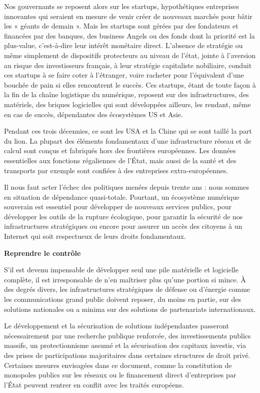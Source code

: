 \documentclass[a4paper]{article}
\begin{document}
Nos gouvernants se reposent alors sur les startups, hypothétiques entreprises innovantes qui seraient en mesure de venir créer de nouveaux marchés pour bâtir les « géants de demain ». Mais les startups sont gérées par des fondateurs et financées par des banques, des business Angels ou des fonds dont la priorité est la plus-value, c’est-à-dire leur intérêt monétaire direct. L'absence de stratégie ou même simplement de dispositifs protecteurs au niveau de l'état, jointe à l'aversion au risque des investisseurs français, à leur stratégie capitaliste nobiliaire, conduit ces startups à se faire coter à l'étranger, voire racheter pour l'équivalent d'une bouchée de pain si elles rencontrent le succès. Ces startups, étant de toute façon à la fin de la chaîne logistique du numérique, reposent sur des infrastructures, des matériels, des briques logicielles qui sont développées ailleurs, les rendant, même en cas de succès, dépendantes des écosystèmes US et Asie. 

Pendant ces trois décennies, ce sont les USA et la Chine qui se sont taillé la part du lion. La plupart des éléments fondamentaux d’une infrastructure réseau et de calcul sont conçus et fabriqués hors des frontières européennes. Les données essentielles aux fonctions régaliennes de l’État, mais aussi de la santé et des transports par exemple sont confiées à des entreprises extra-européennes. 

Il nous faut acter l’échec des politiques menées depuis trente ans : nous sommes en situation de dépendance quasi-totale. Pourtant, un écosystème numérique souverain est essentiel pour développer de nouveaux services publics, pour développer les outils de la rupture écologique, pour garantir la sécurité de nos infrastructures stratégiques ou encore pour assurer un accès des citoyens à un Internet qui soit respectueux de leurs droits fondamentaux. 

\noindent\textbf{Reprendre le contrôle}

S’il est devenu impensable de développer seul une pile matérielle et logicielle complète, il est irresponsable de n’en maîtriser plus qu’une portion si mince. À des degrés divers, les infrastructures stratégiques de défense ou d’énergie comme les communications grand public doivent reposer, du moins en partie, sur des solutions nationales ou a minima sur des solutions de partenariats internationaux. 

Le développement et la sécurisation de solutions indépendantes passeront nécessairement par une recherche publique renforcée, des investissements publics massifs, un protectionnisme assumé et la sécurisation des capitaux investis, via des prises de participations majoritaires dans certaines structures de droit privé. Certaines mesures envisagées dans ce document, comme la constitution de monopoles publics sur les réseaux ou le financement direct d’entreprises par l’État peuvent rentrer en conflit avec les traités européens\cite{interet2019europe}. 
\end{document}
